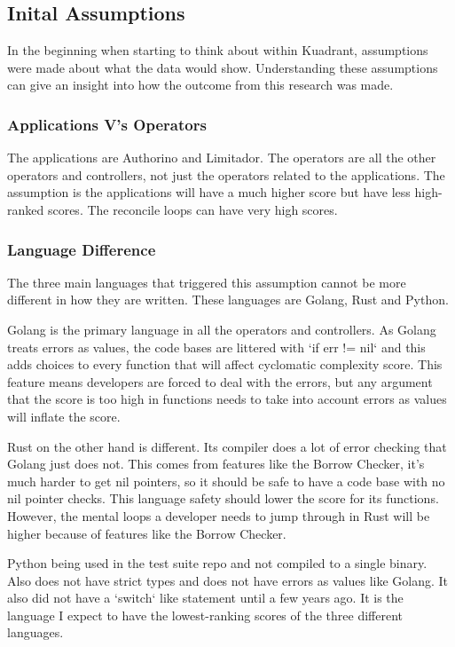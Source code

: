 \subsection{Inital Assumptions}
In the beginning when starting to think about \cc within Kuadrant, assumptions were made about what the data would show.
Understanding these assumptions can give an insight into how the outcome from this research was made.

\subsubsection{Applications V's Operators}
The applications are Authorino and Limitador.
The operators are all the other operators and controllers, not just the operators related to the applications.
The assumption is the applications will have a much higher \cc score but have less high-ranked scores.
The reconcile loops can have very high \cc scores.

\subsubsection{Language Difference}
The three main languages that triggered this assumption cannot be more different in how they are written.
These languages are Golang, Rust and Python.

Golang is the primary language in all the operators and controllers.
As Golang treats errors as values, the code bases are littered with `if err != nil` and this adds choices to every function that will affect cyclomatic complexity score.
This feature means developers are forced to deal with the errors, but any argument that the \cc score is too high in functions needs to take into account errors as values will inflate the \cc score.

Rust on the other hand is different.
Its compiler does a lot of error checking that Golang just does not.
This comes from features like the Borrow Checker, it’s much harder to get nil pointers, so it should be safe to have a code base with no nil pointer checks.
This language safety should lower the \cc score for its functions.
However, the mental loops a developer needs to jump through in Rust will be higher because of features like the Borrow Checker.

Python being used in the test suite repo and not compiled to a single binary.
Also does not have strict types and does not have errors as values like Golang.
It also did not have a `switch` like statement until a few years ago.
It is the language I expect to have the lowest-ranking scores of the three different languages.

